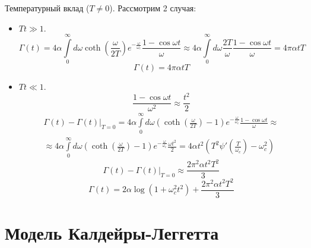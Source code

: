 \documentclass[12pt]{article}
\theoremstyle{definition}
\begin{document}
Температурный вклад ($T\neq0$). Рассмотрим 2 случая:
\begin{itemize}
    \item $Tt\gg1$. 
    \begin{equation}
        \Gamma(t)=4\alpha\int\limits_0^\infty d\omega\coth\left(\frac{\omega}{2T}\right)e^{-\frac{\omega}{\omega_c}}\frac{1-\cos\omega t}{\omega}\approx4\alpha\int\limits_0^\infty d\omega\frac{2T}{\omega}\frac{1-\cos\omega t}{\omega}=4\pi\alpha tT
    \end{equation}
    \begin{equation}
        \boxed{\Gamma(t)=4\pi\alpha tT}
    \end{equation}
    \item $Tt\ll1$.
    \begin{equation}
        \frac{1-\cos\omega t}{\omega^2}\approx\frac{t^2}{2}
    \end{equation}
    \begin{multline}
        \Gamma(t)-\Gamma(t)\bigg|_{T=0}=4\alpha\int\limits_0^\infty d\omega\left(\coth\left(\frac{\omega}{2T}\right)-1\right)e^{-\frac{\omega}{\omega_c}}\frac{1-\cos\omega t}{\omega}\approx\\\approx4\alpha\int\limits_0^\infty d\omega\left(\coth\left(\frac{\omega}{2T}\right)-1\right)e^{-\frac{\omega}{\omega_c}}\frac{\omega t^2}{2}=4\alpha t^2\left(T^2\psi'\left(\frac{T}{\omega_c}\right)-\omega^2_c\right)
    \end{multline}
    \begin{equation}
        \Gamma(t)-\Gamma(t)\bigg|_{T=0}\approx\frac{2\pi^2\alpha t^2T^2}{3}
    \end{equation}
    \begin{equation}
        \boxed{\Gamma(t)=2\alpha\log(1+\omega^2_ct^2)+\frac{2\pi^2\alpha t^2T^2}{3}}
    \end{equation}
\end{itemize}
\section{Модель Калдейры-Леггетта}
\end{document}
